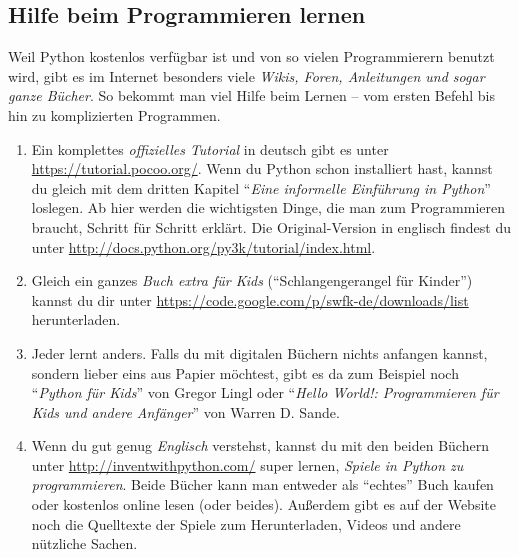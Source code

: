 	\subsection*{Hilfe beim Programmieren lernen}
	Weil Python kostenlos verfügbar ist und von so vielen Programmierern benutzt wird, gibt es im Internet besonders viele \emph{Wikis, Foren, Anleitungen und sogar ganze Bücher}. So bekommt man viel Hilfe beim Lernen – vom ersten Befehl bis hin zu komplizierten Programmen.
	
	\begin{enumerate}
		\item Ein komplettes \emph{offizielles Tutorial} in deutsch gibt es unter \url{https://tutorial.pocoo.org/}. Wenn du Python schon installiert hast, kannst du gleich mit dem dritten Kapitel \enquote{\emph{Eine informelle Einführung in Python}} loslegen. Ab hier werden die wichtigsten Dinge, die man zum Programmieren braucht, Schritt für Schritt erklärt. Die Original-Version in englisch findest du unter \url{http://docs.python.org/py3k/tutorial/index.html}.
		
		\item Gleich ein ganzes \emph{Buch extra für Kids} (\enquote{Schlangengerangel für
Kinder}) kannst du dir unter \url{https://code.google.com/p/swfk-de/downloads/list} herunterladen.
		
		\item Jeder lernt anders. Falls du mit digitalen Büchern nichts anfangen kannst, sondern lieber eins aus Papier möchtest, gibt es da zum Beispiel noch \enquote{\emph{Python für Kids}} von Gregor Lingl oder \enquote{\emph{Hello World!: Programmieren für Kids und andere Anfänger}} von Warren D. Sande.
		
		\item Wenn du gut genug \emph{Englisch} verstehst, kannst du mit den beiden Büchern unter \url{http://inventwithpython.com/} super lernen, \emph{Spiele in Python zu programmieren}. Beide Bücher kann man entweder als \enquote{echtes} Buch kaufen oder kostenlos online lesen (oder beides). Außerdem gibt es auf der Website noch die Quelltexte der Spiele zum Herunterladen, Videos und andere nützliche Sachen.
		
	\end{enumerate}
	
	

